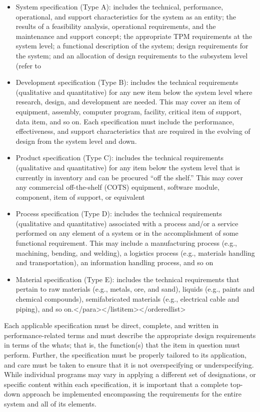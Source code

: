 \begin{itemize}
\item System specification (Type A): includes the technical, performance, operational, and support characteristics for the system as an entity; the results of a feasibility analysis, operational requirements, and the maintenance and support concept; the appropriate TPM requirements at the system level; a functional description of the system; design requirements for the system; and an allocation of design requirements to the subsystem level (refer to 
\item Development specification (Type B): includes the technical requirements (qualitative and quantitative) for any new item below the system level where research, design, and development are needed. This may cover an item of equipment, assembly, computer program, facility, critical item of support, data item, and so on. Each specification must include the performance, effectiveness, and support characteristics that are required in the evolving of design from the system level and down.
\item Product specification (Type C): includes the technical requirements (qualitative and quantitative) for any item below the system level that is currently in inventory and can be procured “off the shelf.” This may cover any commercial off-the-shelf (COTS) equipment, software module, component, item of support, or equivalent
\item Process specification (Type D): includes the technical requirements (qualitative and quantitative) associated with a process and/or a service performed on any element of a system or in the accomplishment of some functional requirement. This may include a manufacturing process (e.g., machining, bending, and welding), a logistics process (e.g., materials handling and transportation), an information handling process, and so on
\item Material specification (Type E): includes the technical requirements that pertain to raw materials (e.g., metals, ore, and sand), liquids (e.g., paints and chemical compounds), semifabricated materials (e.g., electrical cable and piping), and so on.</para></listitem></orderedlist>
\end{itemize}

Each applicable specification must be direct, complete, and written in performance-related terms and must describe the appropriate design requirements in terms of the whats; that is, the function(s) that the item in question must perform. Further, the specification must be properly tailored to its application, and care must be taken to ensure that it is not overspecifying or underspecifying. While individual programs may vary in applying a different set of designations, or specific content within each specification, it is important that a complete top-down approach be implemented encompassing the requirements for the entire system and all of its elements.

